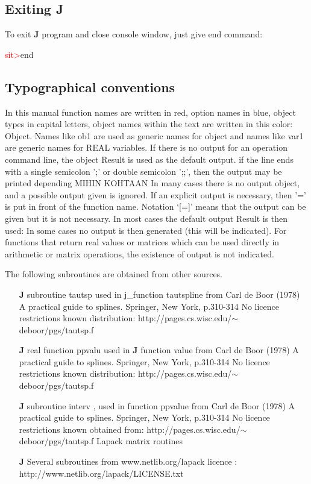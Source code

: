 \subsection{Exiting \textbf{J}}
\label{exit}
To exit \textbf{J} program and close console window, just give end command:

\textcolor{Red}{sit>}end
\subsection{Typographical conventions}
\label{typo}
In this manual function names are written in red, option names in blue, object types in
capital letters, object names within the text are written in this color: {Object}.
Names like {ob1} are used as generic names for object and names like  {var1}
are generic names for REAL variables.
If there is no output for an operation command line,
the object Result is used as the default output.
if the line ends with a single semicolon ';' or double semicolon ';;', then
the output may be printed depending MIHIN KOHTAAN
In many cases there is no output object, and a possible
output given is ignored. If an explicit output is necessary, then '=' is
put in front of the function name. Notation ‘[=]’ means that the output can be given but
it is not necessary. In most cases the default output Result is then used:
In some cases no output is then generated (this will be indicated).
For functions that return real values or matrices which can be
used directly in arithmetic or matrix operations,
the existence of output is not indicated.

\label{license}
The following subroutines are obtained from other sources.
\begin{itemize}

\item[\textbf{J}]  subroutine tautsp used in j\_function tautspline
from Carl de Boor (1978) A practical guide to splines. Springer, New York, p.310-314
No licence restrictions known
distribution:  http://pages.cs.wisc.edu/$\sim$deboor/pgs/tautsp.f

\item[\textbf{J}]  real function ppvalu used in \textbf{J} function value
from Carl de Boor (1978) A practical guide to splines. Springer, New York, p.310-314
No licence restrictions known
distribution: http://pages.cs.wisc.edu/$\sim$deboor/pgs/tautsp.f

\item[\textbf{J}] subroutine interv , used in function ppvalue
from Carl de Boor (1978) A practical guide to splines. Springer, New York, p.310-314
No licence restrictions known
obtained from: http://pages.cs.wisc.edu/$\sim$deboor/pgs/tautsp.f
Lapack matrix routines

\item[\textbf{J}] Several subroutines from www.netlib.org/lapack
licence : http://www.netlib.org/lapack/LICENSE.txt
\end{itemize}
